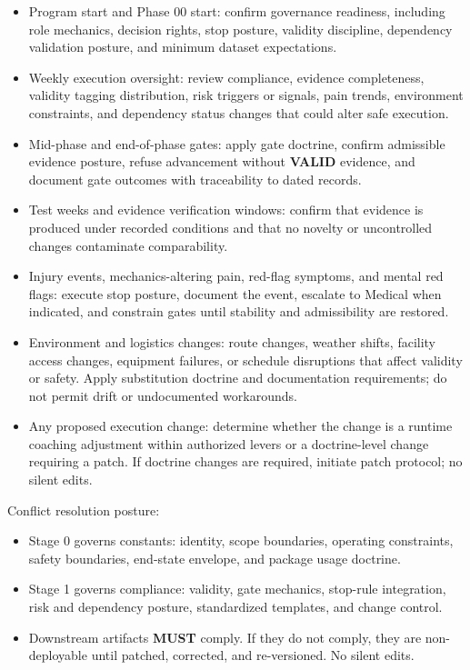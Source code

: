 \documentclass[10pt]{article}
\begin{document}
\begin{itemize}
\item Program start and Phase 00 start: confirm governance readiness, including role mechanics, decision rights, stop posture, validity discipline, dependency validation posture, and minimum dataset expectations.

\item Weekly execution oversight: review compliance, evidence completeness, validity tagging distribution, risk triggers or signals, pain trends, environment constraints, and dependency status changes that could alter safe execution.

\item Mid-phase and end-of-phase gates: apply gate doctrine, confirm admissible evidence posture, refuse advancement without \textbf{VALID} evidence, and document gate outcomes with traceability to dated records.

\item Test weeks and evidence verification windows: confirm that evidence is produced under recorded conditions and that no novelty or uncontrolled changes contaminate comparability.

\item Injury events, mechanics-altering pain, red-flag symptoms, and mental red flags: execute stop posture, document the event, escalate to Medical when indicated, and constrain gates until stability and admissibility are restored.

\item Environment and logistics changes: route changes, weather shifts, facility access changes, equipment failures, or schedule disruptions that affect validity or safety. Apply substitution doctrine and documentation requirements; do not permit drift or undocumented workarounds.

\item Any proposed execution change: determine whether the change is a runtime coaching adjustment within authorized levers or a doctrine-level change requiring a patch. If doctrine changes are required, initiate patch protocol; no silent edits.
\end{itemize}

Conflict resolution posture:

\begin{itemize}
\item Stage 0 governs constants: identity, scope boundaries, operating constraints, safety boundaries, end-state envelope, and package usage doctrine.
\item Stage 1 governs compliance: validity, gate mechanics, stop-rule integration, risk and dependency posture, standardized templates, and change control.
\item Downstream artifacts \textbf{MUST} comply. If they do not comply, they are non-deployable until patched, corrected, and re-versioned. No silent edits.
\end{itemize}
\end{document}
